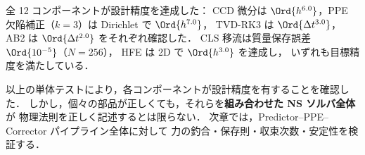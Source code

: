 \begin{tcolorbox}[resultbox, title={コンポーネント検証の総括}]
全 12 コンポーネントが設計精度を達成した：
CCD 微分は $\Ord{h^{6.0}}$，PPE 欠陥補正（$k{=}3$）は Dirichlet で $\Ord{h^{7.0}}$，
TVD-RK3 は $\Ord{\Delta t^{3.0}}$，AB2 は $\Ord{\Delta t^{2.0}}$ をそれぞれ確認した．
CLS 移流は質量保存誤差 $\Ord{10^{-5}}$（$N{=}256$），
HFE は 2D で $\Ord{h^{3.0}}$ を達成し，
いずれも目標精度を満たしている．
\end{tcolorbox}

\noindent
以上の単体テストにより，各コンポーネントが設計精度を有することを確認した．
しかし，個々の部品が正しくても，それらを\textbf{組み合わせた NS ソルバ全体}が
物理法則を正しく記述するとは限らない．
次章では，Predictor--PPE--Corrector パイプライン全体に対して
力の釣合・保存則・収束次数・安定性を検証する．

